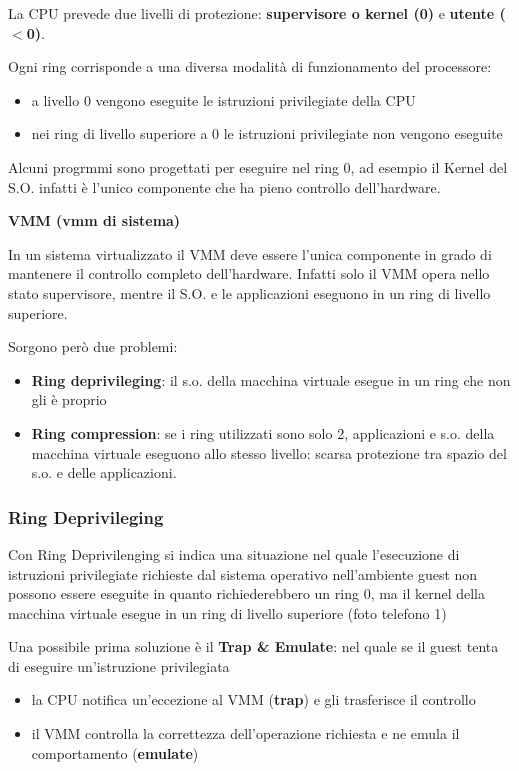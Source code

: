 \documentclass{article}
\begin{document}
La CPU prevede due livelli di protezione: \textbf{supervisore o kernel (0)} e \textbf{utente ($<$0)}.

Ogni ring corrisponde a una diversa modalità di funzionamento del processore:
\begin{itemize}
    \item a livello 0 vengono eseguite le istruzioni privilegiate della CPU
    \item nei ring di livello superiore a 0 le istruzioni privilegiate non vengono eseguite
\end{itemize}

Alcuni progrmmi sono progettati per eseguire nel ring 0, ad esempio il Kernel del S.O. infatti è l'unico componente che ha pieno controllo dell'hardware.

\vspace{3mm}
\textbf{VMM (vmm di sistema)}

In un sistema virtualizzato il VMM deve essere l'unica componente in grado di mantenere il controllo completo dell'hardware. Infatti solo il VMM opera nello stato supervisore, 
mentre il S.O. e le applicazioni eseguono in un ring di livello superiore.

Sorgono però due problemi:
\begin{itemize}
    \item \textbf{Ring deprivileging}: il s.o. della macchina virtuale esegue in un ring che non gli è proprio
    \item \textbf{Ring compression}: se i ring utilizzati sono solo 2, applicazioni e s.o. della macchina virtuale eseguono allo stesso livello: 
    scarsa protezione tra spazio del s.o. e delle applicazioni.
\end{itemize}

\subsubsection{Ring Deprivileging}
Con Ring Deprivilenging si indica una situazione nel quale l'esecuzione di istruzioni privilegiate richieste dal sistema operativo nell'ambiente guest non
possono essere eseguite in quanto richiederebbero un ring 0, ma il kernel della macchina virtuale esegue in un ring di livello superiore (foto telefono 1)

Una possibile prima soluzione è il \textbf{Trap \& Emulate}: nel quale se il guest tenta di eseguire un'istruzione privilegiata

\begin{itemize}
    \item la CPU notifica un'eccezione al VMM (\textbf{trap}) e gli trasferisce il controllo
    \item il VMM controlla la correttezza dell'operazione richiesta e ne emula il comportamento (\textbf{emulate})
\end{itemize}
\end{document}
